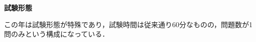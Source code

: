 \documentclass[../../main.tex]{subfiles}
\begin{document}
\noindent\textbf{試験形態}

\vspace{5mm}

この年は試験形態が特殊であり，試験時間は従来通り60分なものの，問題数が1問のみという構成になっている．
\begin{center}
\end{center}
\end{document}
